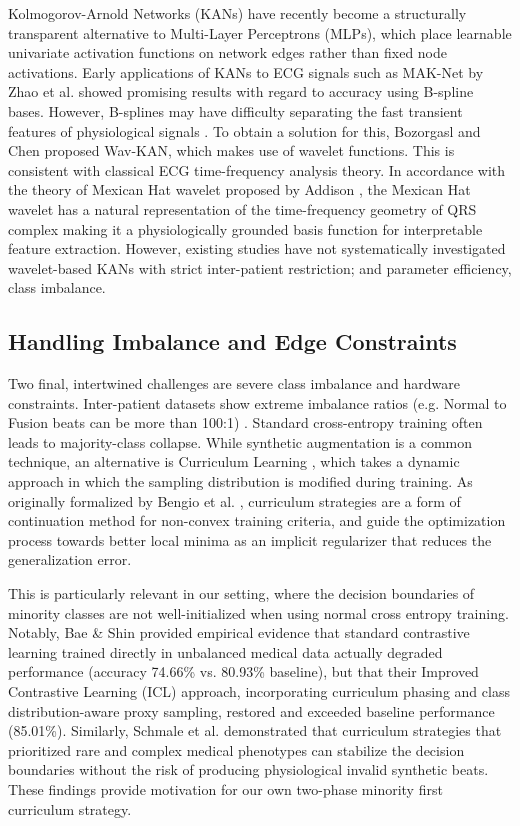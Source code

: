 \documentclass[pdflatex,sn-mathphys-num]{sn-jnl}
\theoremstyle{thmstyleone}
\theoremstyle{thmstyletwo}
\theoremstyle{thmstylethree}
\begin{document}
Kolmogorov-Arnold Networks (KANs) \cite{liu_kan_2024} have recently become a structurally transparent alternative to Multi-Layer Perceptrons (MLPs), which place learnable univariate activation functions on network edges rather than fixed node activations. Early applications of KANs to ECG signals such as MAK-Net by Zhao et al. \cite{zhao_mak-net_2025} showed promising results with regard to accuracy using B-spline bases. However, B-splines may have difficulty separating the fast transient features of physiological signals \cite{bozorgasl_liu_2024}. To obtain a solution for this, Bozorgasl and Chen \cite{bozorgasl_liu_2024} proposed Wav-KAN, which makes use of wavelet functions. This is consistent with classical ECG time-frequency analysis theory. In accordance with the theory of Mexican Hat wavelet proposed by Addison \cite{addison_wavelet_2005}, the Mexican Hat wavelet has a natural representation of the time-frequency geometry of QRS complex making it a physiologically grounded basis function for interpretable feature extraction. However, existing studies have not systematically investigated wavelet-based KANs with strict inter-patient restriction; and parameter efficiency, class imbalance.

\subsection{Handling Imbalance and Edge Constraints}
Two final, intertwined challenges are severe class imbalance and hardware constraints. Inter-patient datasets show extreme imbalance ratios (e.g. Normal to Fusion beats can be more than 100:1) \cite{silva_systematic_2025}. Standard cross-entropy training often leads to majority-class collapse. While synthetic augmentation is a common technique, an alternative is Curriculum Learning \cite{bengio_curriculum_2009}, which takes a dynamic approach in which the sampling distribution is modified during training. As originally formalized by Bengio et al. \cite{bengio_curriculum_2009}, curriculum strategies are a form of continuation method for non-convex training criteria, and guide the optimization process towards better local minima as an implicit regularizer that reduces the generalization error.

This is particularly relevant in our setting, where the decision boundaries of minority classes are not well-initialized when using normal cross entropy training. Notably, Bae \& Shin \cite{bae_handling_2025} provided empirical evidence that standard contrastive learning trained directly in unbalanced medical data actually degraded performance (accuracy 74.66\% vs. 80.93\% baseline), but that their Improved Contrastive Learning (ICL) approach, incorporating curriculum phasing and class distribution-aware proxy sampling, restored and exceeded baseline performance (85.01\%). Similarly, Schmale et al. \cite{schmale_curriculum_2025} demonstrated that curriculum strategies that prioritized rare and complex medical phenotypes can stabilize the decision boundaries without the risk of producing physiological invalid synthetic beats. These findings provide motivation for our own two-phase minority first curriculum strategy.
\end{document}
